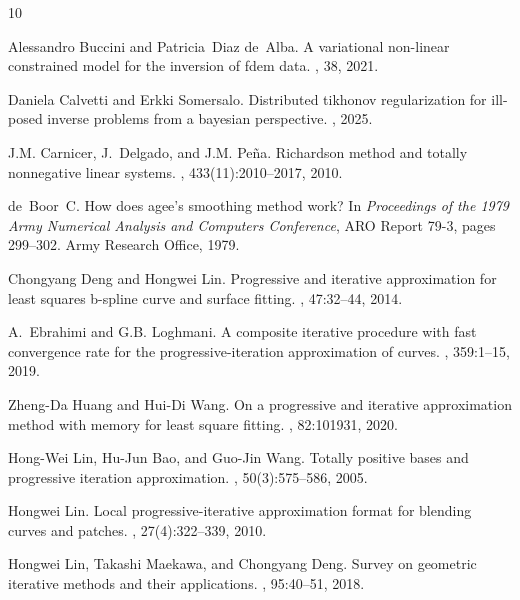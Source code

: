 \documentclass[11pt]{article}
\numberwithin{equation}{section}
\begin{document}
\begin{thebibliography}{10}

Alessandro Buccini and Patricia~Diaz de~Alba.
\newblock A variational non-linear constrained model for the inversion of fdem data.
, 38, 2021.

Daniela Calvetti and Erkki Somersalo.
\newblock Distributed tikhonov regularization for ill-posed inverse problems from a bayesian perspective.
, 2025.

J.M. Carnicer, J.~Delgado, and J.M. Peña.
\newblock Richardson method and totally nonnegative linear systems.
, 433(11):2010--2017, 2010.

de~Boor~C.
\newblock How does agee’s smoothing method work?
\newblock In {\em Proceedings of the 1979 Army Numerical Analysis and Computers Conference}, ARO Report 79-3, pages 299--302. Army Research Office, 1979.

Chongyang Deng and Hongwei Lin.
\newblock Progressive and iterative approximation for least squares b-spline curve and surface fitting.
, 47:32--44, 2014.

A.~Ebrahimi and G.B. Loghmani.
\newblock A composite iterative procedure with fast convergence rate for the progressive-iteration approximation of curves.
, 359:1--15, 2019.

Zheng-Da Huang and Hui-Di Wang.
\newblock On a progressive and iterative approximation method with memory for least square fitting.
, 82:101931, 2020.

Hong-Wei Lin, Hu-Jun Bao, and Guo-Jin Wang.
\newblock Totally positive bases and progressive iteration approximation.
, 50(3):575--586, 2005.

Hongwei Lin.
\newblock Local progressive-iterative approximation format for blending curves and patches.
, 27(4):322--339, 2010.

Hongwei Lin, Takashi Maekawa, and Chongyang Deng.
\newblock Survey on geometric iterative methods and their applications.
, 95:40--51, 2018.


\end{thebibliography}
\end{document}
